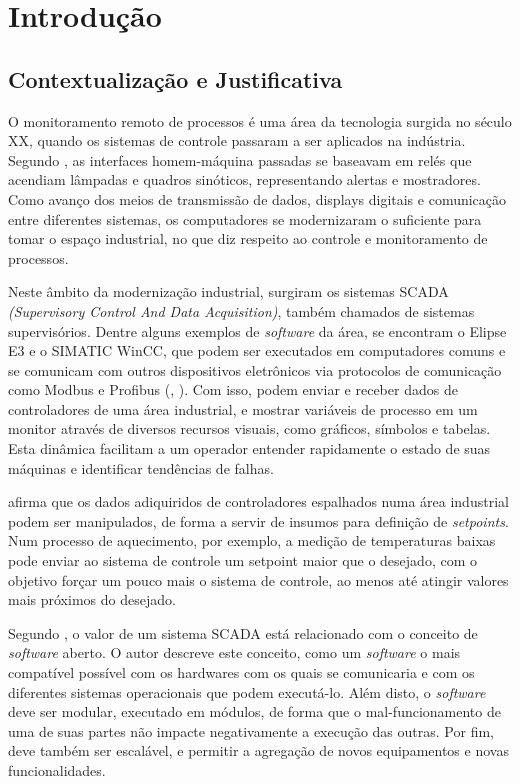\chapter{Introdução} \label{Chap:Introdução}

\section{Contextualização e Justificativa}

O monitoramento remoto de processos é uma área da tecnologia surgida no século XX, quando os sistemas de controle passaram a ser aplicados na indústria. Segundo , as interfaces homem-máquina passadas se baseavam em relés que acendiam lâmpadas e quadros sinóticos, representando alertas e mostradores. Como avanço dos meios de transmissão de dados, displays digitais e comunicação entre diferentes sistemas, os computadores se modernizaram o suficiente para tomar o espaço industrial, no que diz respeito ao controle e monitoramento de processos.

Neste âmbito da modernização industrial, surgiram os sistemas SCADA
\textit{\textup{(}Supervisory Control And Data Acquisition\textup{)}}, também chamados de sistemas supervisórios. Dentre alguns exemplos de \textit{software} da área, se encontram o Elipse E3 e o SIMATIC WinCC, que podem ser executados em computadores comuns e se comunicam com outros dispositivos eletrônicos via protocolos de comunicação como Modbus e Profibus (\cite{Elipse2012}, \cite{Siemens1999}). Com isso, podem enviar e receber dados de controladores de uma área industrial, e mostrar variáveis de processo em um monitor através de diversos recursos visuais, como gráficos, símbolos e tabelas. Esta dinâmica facilitam a um operador entender rapidamente o estado de suas máquinas e identificar tendências de falhas.

 afirma que os dados adiquiridos de controladores espalhados numa área industrial podem ser manipulados, de forma a servir de insumos para definição de \emph{setpoints}. Num processo de aquecimento, por exemplo, a medição de temperaturas baixas pode enviar ao sistema de controle um setpoint maior que o desejado, com o objetivo forçar um pouco mais o sistema de controle, ao menos até atingir valores mais próximos do desejado.

Segundo , o valor de um sistema SCADA está relacionado com o conceito de \textit{software} aberto. O autor descreve este conceito, como um \textit{software} o mais compatível possível com os hardwares com os quais se comunicaria e com os diferentes sistemas operacionais que podem executá-lo. Além disto, o \emph{software} deve ser modular, executado em módulos, de forma que o mal-funcionamento de uma de suas partes não impacte negativamente a execução das outras. Por fim, deve também ser escalável, e permitir a agregação de novos equipamentos e novas funcionalidades.

